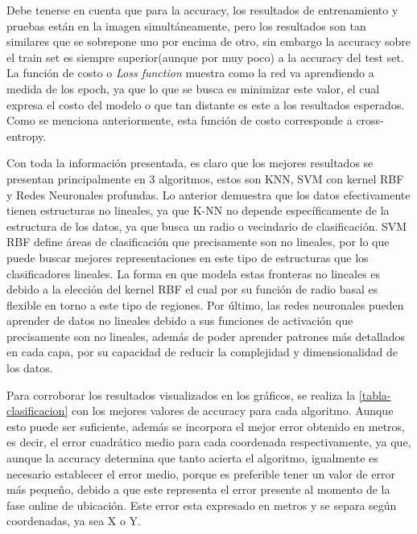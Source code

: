 Debe tenerse en cuenta que para la accuracy, los resultados de entrenamiento y pruebas están en la imagen simultáneamente, pero los resultados son tan similares que se sobrepone uno por encima de otro, sin embargo la accuracy sobre el train set es siempre superior(aunque por muy poco) a la accuracy del test set. La función de costo o \textit{Loss function} muestra como la red va aprendiendo a medida de los epoch, ya que lo que se busca es minimizar este valor, el cual expresa el costo del modelo o que tan distante es este a los resultados esperados. Como se menciona anteriormente, esta función de costo corresponde a cross-entropy.

Con toda la información presentada, es claro que los mejores resultados se presentan principalmente en 3 algoritmos, estos son KNN, SVM con kernel RBF y Redes Neuronales profundas. Lo anterior demuestra que los datos efectivamente tienen estructuras no lineales, ya que K-NN no depende específicamente de la estructura de los datos, ya que busca un radio o vecindario de clasificación. SVM RBF define áreas de clasificación que precisamente son no lineales, por lo que puede buscar mejores representaciones en este tipo de estructuras que los clasificadores lineales. La forma en que modela estas fronteras no lineales es debido a la elección del kernel RBF el cual por su función de radio basal es flexible en torno a este tipo de regiones. Por último, las redes neuronales pueden aprender de datos no lineales debido a sus funciones de activación que precisamente son no lineales, además de poder aprender patrones más detallados en cada capa, por su capacidad de reducir la complejidad y dimensionalidad de los datos.

Para corroborar los resultados visualizados en los gráficos, se realiza la \autoref{tabla-clasificacion} con los mejores valores de accuracy para cada algoritmo. Aunque esto puede ser suficiente, además se incorpora el mejor error obtenido en metros, es decir, el error cuadrático medio para cada coordenada respectivamente, ya que, aunque la accuracy determina que tanto acierta el algoritmo, igualmente es necesario establecer el error medio, porque es preferible tener un valor de error más pequeño, debido a que este representa el error presente al momento de la fase online de ubicación. Este error esta expresado en metros y se separa según coordenadas, ya sea X o Y.


